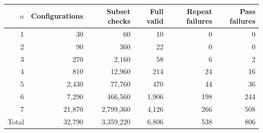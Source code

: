 \begin{tabular}{rrrrrr}
\toprule
$n$ & Configurations & Subset checks & Full valid & Repeat failures & Pass failures \\
\midrule
1 & 30 & 60 & 10 & 0 & 0 \\
2 & 90 & 360 & 22 & 0 & 0 \\
3 & 270 & 2,160 & 58 & 6 & 2 \\
4 & 810 & 12,960 & 214 & 24 & 16 \\
5 & 2,430 & 77,760 & 470 & 44 & 36 \\
6 & 7,290 & 466,560 & 1,906 & 198 & 244 \\
7 & 21,870 & 2,799,360 & 4,126 & 266 & 508 \\
\midrule
Total & 32,790 & 3,359,220 & 6,806 & 538 & 806 \\
\bottomrule
\end{tabular}
